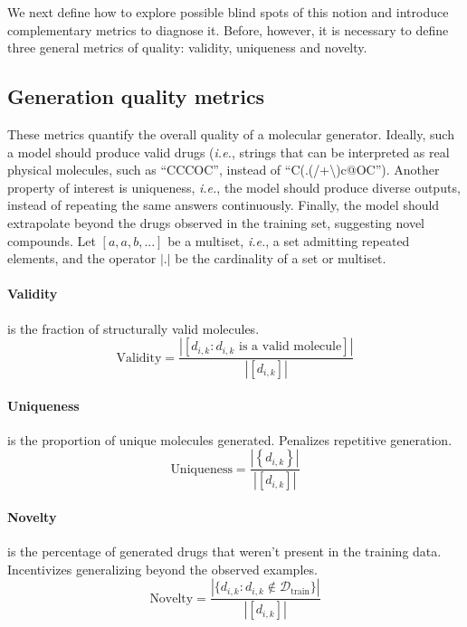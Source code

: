\documentclass[a4paper,12pt]{article}
\begin{document}
We next define how to explore possible blind spots of this notion and introduce complementary metrics to diagnose it. Before, however, it is necessary to define three general metrics of quality: validity, uniqueness and novelty.

\subsection{Generation quality metrics}
These metrics quantify the overall quality of a molecular generator. Ideally, such a model should produce valid drugs (\emph{i.e.}, strings that can be interpreted as real physical molecules, such as ``CCCOC'', instead of ``C(.(/+\textbackslash)c@OC''). Another property of interest is uniqueness, \emph{i.e.}, the model should produce diverse outputs, instead of repeating the same answers continuously. Finally, the model should extrapolate beyond the drugs observed in the training set, suggesting novel compounds. Let $[a, a, b, ...]$ be a multiset, \emph{i.e.}, a set admitting repeated elements, and the operator $|.|$ be the cardinality of a set or multiset.

\paragraph{Validity} is the fraction of structurally valid molecules.\\
\begin{equation}
    \text{Validity}=\dfrac{|\left[d_{i,k}:d_{i,k}\text{ is a valid molecule}\right]|}{|\left[d_{i,k}\right]|}
\end{equation}

\paragraph{Uniqueness} is the proportion of unique molecules generated. Penalizes repetitive generation.
\begin{equation}
    \text{Uniqueness}=\dfrac{|\left\{d_{i,k}\right\}|}{|\left[d_{i,k}\right]|}
\end{equation}

\paragraph{Novelty} is the percentage of generated drugs that weren't present in the training data. Incentivizes generalizing beyond the observed examples.
\begin{equation}
    \text{Novelty}=\dfrac{|\{d_{i,k}:d_{i,k}\notin\mathcal{D}_\text{train}\}|}{|\left[d_{i,k}\right]|}
\end{equation}
\end{document}
